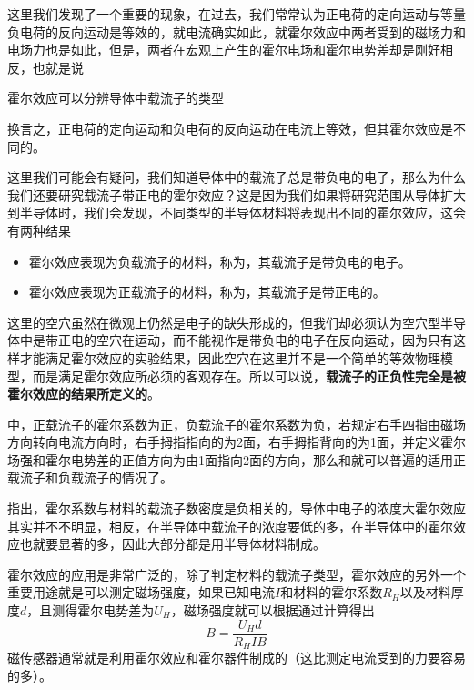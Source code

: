 这里我们发现了一个重要的现象，在过去，我们常常认为正电荷的定向运动与等量负电荷的反向运动是等效的，就电流确实如此，就霍尔效应中两者受到的磁场力和电场力也是如此，但是，两者在宏观上产生的霍尔电场和霍尔电势差却是刚好相反，也就是说
\begin{center}
    霍尔效应可以分辨导体中载流子的类型
\end{center}
换言之，正电荷的定向运动和负电荷的反向运动在电流上等效，但其霍尔效应是不同的。

这里我们可能会有疑问，我们知道导体中的载流子总是带负电的电子，那么为什么我们还要研究载流子带正电的霍尔效应？这是因为我们如果将研究范围从导体扩大到半导体时，我们会发现，不同类型的半导体材料将表现出不同的霍尔效应，这会有两种结果
\begin{itemize}
    \item 霍尔效应表现为负载流子的材料，称为，其载流子是带负电的电子。
    \item 霍尔效应表现为正载流子的材料，称为，其载流子是带正电的。
\end{itemize}
这里的空穴虽然在微观上仍然是电子的缺失形成的，但我们却必须认为空穴型半导体中是带正电的空穴在运动，而不能视作是带负电的电子在反向运动，因为只有这样才能满足霍尔效应的实验结果，因此空穴在这里并不是一个简单的等效物理模型，而是满足霍尔效应所必须的客观存在。所以可以说，\textbf{载流子的正负性完全是被霍尔效应的结果所定义的}。

中，正载流子的霍尔系数为正，负载流子的霍尔系数为负，若规定右手四指由磁场方向转向电流方向时，右手拇指指向的为2面，右手拇指背向的为1面，并定义霍尔场强和霍尔电势差的正值方向为由1面指向2面的方向，那么和就可以普遍的适用正载流子和负载流子的情况了。

指出，霍尔系数与材料的载流子数密度是负相关的，导体中电子的浓度大霍尔效应其实并不不明显，相反，在半导体中载流子的浓度要低的多，在半导体中的霍尔效应也就要显著的多，因此大部分都是用半导体材料制成。

霍尔效应的应用是非常广泛的，除了判定材料的载流子类型，霍尔效应的另外一个重要用途就是可以测定磁场强度，如果已知电流$I$和材料的霍尔系数$R_H$以及材料厚度$d$，且测得霍尔电势差为$U_H$，磁场强度就可以根据通过计算得出
\begin{equation*}
    B=\frac{U_Hd}{R_HIB}
\end{equation*}
磁传感器通常就是利用霍尔效应和霍尔器件制成的（这比测定电流受到的力要容易的多）。



